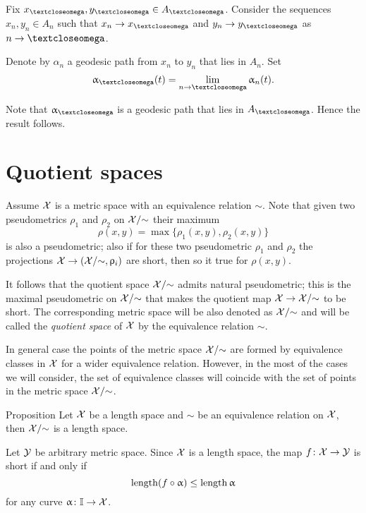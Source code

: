 Fix $x_\o,y_\o\in A_\o$.
Consider the sequences $x_n,y_n\in A_n$ such that $x_n\to x_\o$ and $y_n\to y_\o$ as $n\to\o$.

Denote by $\alpha_n$ a geodesic path from $x_n$ to $y_n$ that lies in $A_n$.
Set
\[\alpha_\o(t)=\lim_{n\to \o}\alpha_n(t).\]

Note that $\alpha_\o$ is a geodesic path that lies in $A_\o$.
Hence the result follows.
\qeds






\section{Quotient spaces}\label{sec:quotient}

 Assume $\mathcal{X}$ is a metric space
with an equivalence relation $\sim$.
Note that given two pseudometrics $\rho_1$ and $\rho_2$ on $\mathcal{X}/{\sim}$
their maximum 
\[\rho(x,y)=\max\{\rho_1(x,y),\rho_2(x,y)\}\]
is also a pseudometric;
also if for these two pseudometric $\rho_1$ and $\rho_2$ the projections $\spc{X}\to(\spc{X}/{\sim},\rho_i)$ are short, then so it true for $\rho(x,y)$.

It follows that 
the quotient space $\mathcal{X}/{\sim}$ admits natural pseudometric;
this is the maximal pseudometric on  $\mathcal{X}/{\sim}$ 
that makes the quotient map 
$\spc{X}\to\spc{X}/{\sim}$ to be short.
The corresponding metric space will be also denoted as $\mathcal{X}/{\sim}$
and will be called the \emph{quotient space} of $\mathcal{X}$ by the equivalence relation $\sim$.

In general case the points of the metric space $\mathcal{X}/{\sim}$
are formed by equivalence classes in $\mathcal{X}$
for a wider equivalence relation.
However, in the most of the cases we will consider, 
the set of equivalence classes will coincide with the set of points in the metric space $\mathcal{X}/{\sim}$.



\begin{thm}{Proposition}\label{prop:length-X}
Let $\mathcal{X}$ be a length space and 
$\sim$ be an equivalence relation on $\mathcal{X}$, then $\mathcal{X}/{\sim}$
is a length space.
\end{thm}

Let $\mathcal{Y}$ be arbitrary metric space.
Since $\mathcal{X}$ is a length space,
the map $f\:\spc{X}\to \spc{Y}$ is short if and only if 
\[\length(f\circ\alpha)\le \length\alpha\]
for any curve
$\alpha\:\II\to \spc{X}$.

